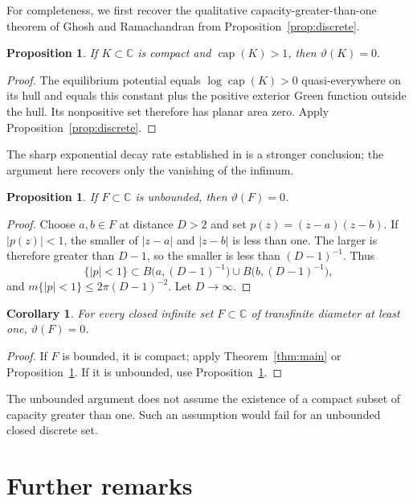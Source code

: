 \documentclass[11pt]{article}
\newcommand{\C}{\mathbb C}
\DeclareMathOperator{\caplog}{cap}
\newtheorem{proposition}[theorem]{Proposition}
\newtheorem{corollary}[theorem]{Corollary}
\theoremstyle{remark}
\numberwithin{equation}{section}
\begin{document}
For completeness, we first recover the qualitative
capacity-greater-than-one theorem of Ghosh and Ramachandran
\cite[Theorem~3.1]{GR2026} from Proposition~\ref{prop:discrete}.

\begin{proposition}\label{prop:greater}
If $K\subset\C$ is compact and $\caplog(K)>1$, then
$\vartheta(K)=0$.
\end{proposition}

\begin{proof}
The equilibrium potential equals $\log\caplog(K)>0$ quasi-everywhere
on its hull and equals this constant plus the positive exterior Green
function outside the hull. Its nonpositive set therefore has planar
area zero. Apply Proposition~\ref{prop:discrete}.
\end{proof}

The sharp exponential decay rate established in
\cite[Theorem~3.3]{GR2026} is a stronger conclusion; the argument here
recovers only the vanishing of the infimum.

\begin{proposition}\label{prop:unbounded}
If $F\subset\C$ is unbounded, then $\vartheta(F)=0$.
\end{proposition}

\begin{proof}
Choose $a,b\in F$ at distance $D>2$ and set $p(z)=(z-a)(z-b)$.
If $|p(z)|<1$, the smaller of $|z-a|$ and $|z-b|$ is less than one.
The larger is therefore greater than $D-1$, so the smaller is less
than $(D-1)^{-1}$. Thus
\[
 \{|p|<1\}\subset
 B\bigl(a,(D-1)^{-1}\bigr)\cup B\bigl(b,(D-1)^{-1}\bigr),
\]
and $m\{|p|<1\}\le2\pi(D-1)^{-2}$. Let $D\to\infty$.
\end{proof}

\begin{corollary}\label{cor:closed}
For every closed infinite set $F\subset\C$ of transfinite diameter
at least one, $\vartheta(F)=0$.
\end{corollary}

\begin{proof}
If $F$ is bounded, it is compact; apply Theorem~\ref{thm:main} or
Proposition~\ref{prop:greater}. If it is unbounded, use
Proposition~\ref{prop:unbounded}.
\end{proof}

The unbounded argument does not assume the existence of a compact
subset of capacity greater than one. Such an assumption would fail
for an unbounded closed discrete set.

\section{Further remarks}
\end{document}
